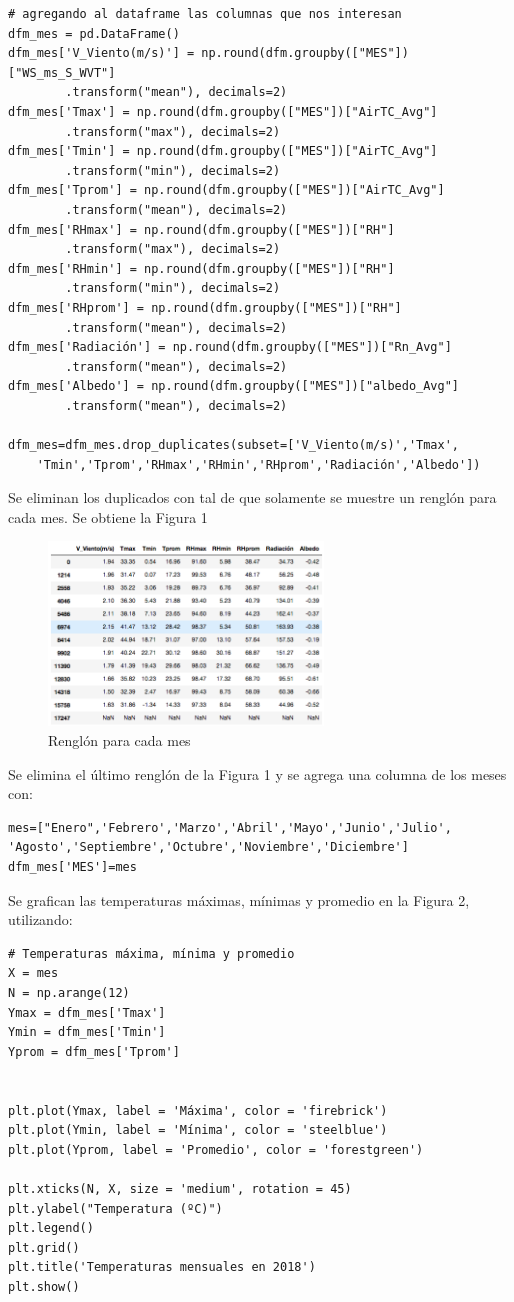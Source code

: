 \documentclass[11pt, spanish]{report}
\begin{document}
\begin{verbatim}
# agregando al dataframe las columnas que nos interesan
dfm_mes = pd.DataFrame()
dfm_mes['V_Viento(m/s)'] = np.round(dfm.groupby(["MES"])["WS_ms_S_WVT"]
        .transform("mean"), decimals=2)
dfm_mes['Tmax'] = np.round(dfm.groupby(["MES"])["AirTC_Avg"]
        .transform("max"), decimals=2)
dfm_mes['Tmin'] = np.round(dfm.groupby(["MES"])["AirTC_Avg"]
        .transform("min"), decimals=2)
dfm_mes['Tprom'] = np.round(dfm.groupby(["MES"])["AirTC_Avg"]
        .transform("mean"), decimals=2)
dfm_mes['RHmax'] = np.round(dfm.groupby(["MES"])["RH"]
        .transform("max"), decimals=2)
dfm_mes['RHmin'] = np.round(dfm.groupby(["MES"])["RH"]
        .transform("min"), decimals=2)
dfm_mes['RHprom'] = np.round(dfm.groupby(["MES"])["RH"]
        .transform("mean"), decimals=2)
dfm_mes['Radiación'] = np.round(dfm.groupby(["MES"])["Rn_Avg"]
        .transform("mean"), decimals=2)
dfm_mes['Albedo'] = np.round(dfm.groupby(["MES"])["albedo_Avg"]
        .transform("mean"), decimals=2)

dfm_mes=dfm_mes.drop_duplicates(subset=['V_Viento(m/s)','Tmax',
    'Tmin','Tprom','RHmax','RHmin','RHprom','Radiación','Albedo'])
\end{verbatim}
Se eliminan los duplicados con tal de que solamente se muestre un renglón para cada mes. Se obtiene la Figura 1
\begin{figure}[ht]
\caption{Renglón para cada mes}
\centering
\includegraphics[width=0.65\textwidth]{dfm_mes.png}
\end{figure}
Se elimina el último renglón de la Figura 1 y se agrega una columna de los meses con:
\begin{verbatim}
mes=["Enero",'Febrero','Marzo','Abril','Mayo','Junio','Julio',
'Agosto','Septiembre','Octubre','Noviembre','Diciembre']
dfm_mes['MES']=mes
\end{verbatim}
Se grafican las temperaturas máximas, mínimas y promedio en la Figura 2, utilizando:
\begin{verbatim}
# Temperaturas máxima, mínima y promedio
X = mes                 
N = np.arange(12)         
Ymax = dfm_mes['Tmax']     
Ymin = dfm_mes['Tmin']     
Yprom = dfm_mes['Tprom']     


plt.plot(Ymax, label = 'Máxima', color = 'firebrick')   
plt.plot(Ymin, label = 'Mínima', color = 'steelblue')   
plt.plot(Yprom, label = 'Promedio', color = 'forestgreen')   

plt.xticks(N, X, size = 'medium', rotation = 45)  
plt.ylabel("Temperatura (ºC)")  
plt.legend()
plt.grid()
plt.title('Temperaturas mensuales en 2018')
plt.show()
\end{verbatim}
\end{document}
